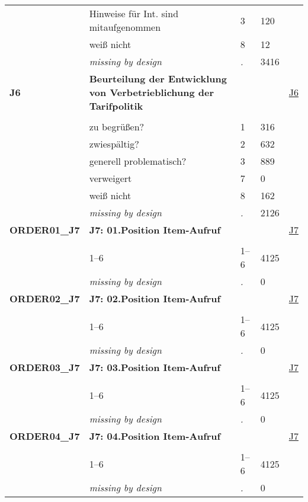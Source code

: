 \begin{longtable}{| L{2.65cm} | L{8cm} | C{1.5cm} | R{1.25cm} | C{2.25cm}  |}
   & Hinweise für Int. sind mitaufgenommen & 3 & 120 &  \\ 
   & weiß nicht & 8 & 12 &  \\ 
   & \textit{missing by design} & \textit{.} & 3416 &  \\ 
   \midrule
\textbf{J6}\label{var:J6} & \textbf{Beurteilung der Entwicklung von Verbetrieblichung der Tarifpolitik} &  &  & \hyperref[J6]{J6} \\ 
   &  &  &  &  \\ 
   & zu begrüßen? & 1 & 316 &  \\ 
   & zwiespältig? & 2 & 632 &  \\ 
   & generell problematisch? & 3 & 889 &  \\ 
   & verweigert & 7 & 0 &  \\ 
   & weiß nicht & 8 & 162 &  \\ 
   & \textit{missing by design} & \textit{.} & 2126 &  \\ 
   \midrule
\textbf{ORDER01\_J7}\label{var:ORDER01:J7} & \textbf{J7: 01.Position Item-Aufruf} &  &  & \hyperref[J7]{J7} \\ 
   &  &  &  &  \\ 
   & 1--6 & 1--6 & 4125 &  \\ 
   & \textit{missing by design} & \textit{.} & 0 &  \\ 
   \midrule
\textbf{ORDER02\_J7}\label{var:ORDER02:J7} & \textbf{J7: 02.Position Item-Aufruf} &  &  & \hyperref[J7]{J7} \\ 
   &  &  &  &  \\ 
   & 1--6 & 1--6 & 4125 &  \\ 
   & \textit{missing by design} & \textit{.} & 0 &  \\ 
   \midrule
\textbf{ORDER03\_J7}\label{var:ORDER03:J7} & \textbf{J7: 03.Position Item-Aufruf} &  &  & \hyperref[J7]{J7} \\ 
   &  &  &  &  \\ 
   & 1--6 & 1--6 & 4125 &  \\ 
   & \textit{missing by design} & \textit{.} & 0 &  \\ 
   \midrule
\textbf{ORDER04\_J7}\label{var:ORDER04:J7} & \textbf{J7: 04.Position Item-Aufruf} &  &  & \hyperref[J7]{J7} \\ 
   &  &  &  &  \\ 
   & 1--6 & 1--6 & 4125 &  \\ 
   & \textit{missing by design} & \textit{.} & 0 &  \\ 

\end{longtable}
